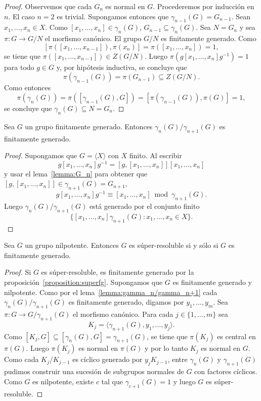 \begin{proof}
	Observemos que cada $G_n$ es normal en $G$.  Procederemos por inducción en
	$n$. El caso $n=2$ es trivial. Supongamos entonces que
	$\gamma_{n-1}(G)=G_{n-1}$. Sean $x_1,\dots,x_n\in X$. Como
	$[x_1,\dots,x_n]\in\gamma_{n}(G)$, $G_{n-1}\subseteq\gamma_n(G)$. Sea
	$N=G_n$ y sea $\pi\colon G\to G/N$ el morfismo canónico. El grupo $G/N$ es
	finitamente generado. Como
	\[
	[\pi([x_1,\dots,x_{n-1}]),\pi(x_n)]=\pi([x_1,\dots,x_n])=1,
	\]
	se tiene que $\pi([x_1,\dots,x_{n-1}])\in Z(G/N)$. Luego
	$\pi(g[x_1,\dots,x_n]g^{-1})=1$ para todo $g\in G$ y, por hipótesis
	inductiva, 
	se concluye que 
	\[
	\pi(\gamma_{n-1}(G))=\pi(G_{n-1})\subseteq Z(G/N).
	\]
	Como entonces 
	\[
	\pi(\gamma_{n}(G))=\pi([\gamma_{n-1}(G),G])=[\pi(\gamma_{n-1}(G)),\pi(G)]=1,
	\]
	se concluye que $\gamma_n(G)\subseteq N=G_n$.
\end{proof}

\begin{lemma}
	\label{lemma:gamma_n/gamma_n+1}
	Sea $G$ un grupo finitamente generado.  Entonces
	$\gamma_n(G)/\gamma_{n+1}(G)$ es finitamente generado. 
\end{lemma}

\begin{proof}
	Supongamos que $G=\langle X\rangle$ con $X$ finito. 
	Al escribir 
	\[
	g[x_1,\dots,x_n]g^{-1}=[g,[x_1,\dots,x_n]][x_1,\dots,x_n]
	\]
	y usar el lema~\ref{lemma:G_n} para obtener 
	que $[g,[x_1,\dots,x_n]]\in \gamma_{n+1}(G)=G_{n+1}$, 
	\[
	g[x_1,\dots,x_n]g^{-1}\equiv [x_1,\dots,x_n]\bmod \gamma_{n+1}(G). 
	\]
	Luego $\gamma_{n}(G)/\gamma_{n+1}(G)$ está generado por 
	el conjunto finito 
	\[
	\{[x_1,\dots,x_n]\gamma_{n+1}(G):x_1,\dots,x_n\in X\}. 
	\]
\end{proof}

\begin{theorem}
	\label{theorem:super=fg}
	Sea $G$ un grupo nilpotente. Entonces $G$ es súper-resoluble si y sólo si
	$G$ es finitamente generado.
\end{theorem}

\begin{proof}
	Si $G$ es súper-resoluble, es finitamente generado por la
	proposición~\ref{proposition:superfg}.  Supongamos que $G$ es finitamente
	generado y nilpotente. Como por el lema~\ref{lemma:gamma_n/gamma_n+1} cada
	$\gamma_{n}(G)/\gamma_{n+1}(G)$ es finitamente generado, digamos por
	$y_1,\dots,y_m$. Sea $\pi\colon G\to G/\gamma_{n+1}(G)$ el morfismo
	canónico.  Para cada $j\in\{1,\dots,m\}$ sea 
	\[
	K_j=\langle \gamma_{n+1}(G),y_1,\dots,y_j\rangle.
	\]
	Como
	$[K_j,G]\subseteq [\gamma_n(G),G]=\gamma_{n+1}(G)$, 
	se tiene que $\pi(K_j)$ es central en $\pi(G)$. Luego $\pi(K_j)$ es normal
	en $\pi(G)$ y por lo tanto $K_j$ es normal en $G$. Como cada $K_j/K_{j-1}$
	es cíclico generado por $y_jK_{j-1}$, entre $\gamma_n(G)$ y
	$\gamma_{n+1}(G)$ pudimos construir una sucesión de subgrupos normales de
	$G$ con factores cíclicos. Como $G$ es nilpotente, existe $c$ tal que
	$\gamma_{c+1}(G)=1$ y luego $G$ es súper-resoluble.
\end{proof}

